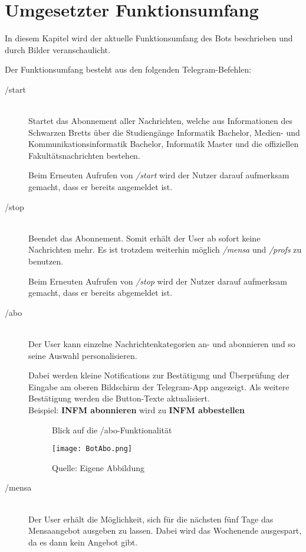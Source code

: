 \chapter{Umgesetzter Funktionsumfang}\label{sec:Funktionsumfang}
In diesem Kapitel wird der aktuelle Funktionsumfang des Bots beschrieben und durch Bilder veranschaulicht.

Der Funktionsumfang besteht aus den folgenden Telegram-Befehlen:

\begin{description}
  \item[/start] \hfill \\
  Startet das Abonnement aller Nachrichten, welche aus Informationen des Schwarzen Bretts über die Studiengänge Informatik Bachelor, Medien- und Kommunikationsinformatik Bachelor, Informatik Master und die offiziellen Fakultätsnachrichten bestehen.

  Beim Erneuten Aufrufen von \emph{/start} wird der Nutzer darauf aufmerksam gemacht, dass er bereits angemeldet ist.
  \item[/stop] \hfill \\
  Beendet das Abonnement. Somit erhält der User ab sofort keine Nachrichten mehr. Es ist trotzdem weiterhin möglich \emph{/mensa} und \emph{/profs} zu benutzen.

  Beim Erneuten Aufrufen von \emph{/stop} wird der Nutzer darauf aufmerksam gemacht, dass er bereits abgemeldet ist.
  \newpage
  \item[/abo] \hfill \\
  Der User kann einzelne Nachrichtenkategorien an- und abonnieren und so seine Auswahl personalisieren.

  Dabei werden kleine Notifications zur Bestätigung und Überprüfung der Eingabe am oberen Bildschirm der Telegram-App angezeigt. Als weitere Bestätigung werden die Button-Texte aktualisiert. \\
  Beispiel: \textbf{INFM abonnieren} wird zu \textbf{INFM abbestellen}

  \begin{figure}[!htb]
      \centering
      \caption{Blick auf die /abo-Funktionalität}
        \texttt{[image: BotAbo.png]}
      \caption*{Quelle: Eigene Abbildung}
  \end{figure}

  \item[/mensa] \hfill \\
  Der User erhält die Möglichkeit, sich für die nächsten fünf Tage das Mensaangebot ausgeben zu lassen. Dabei wird das Wochenende ausgespart, da es dann kein Angebot gibt.


\end{description}
